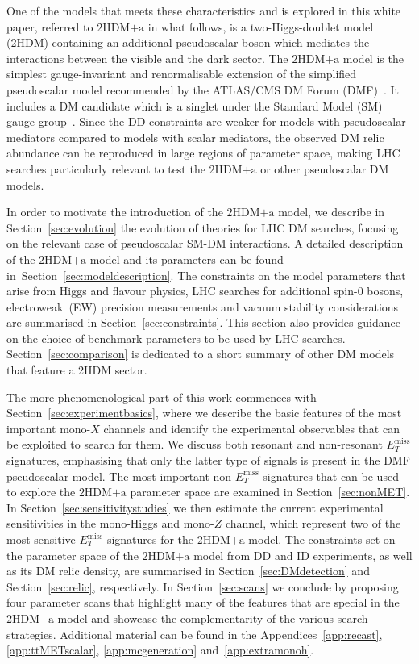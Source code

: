 \documentclass[a4paper, 11pt,notoc]{article}
\newcommand{\MET}{\ensuremath{E_T^\mathrm{miss}}\xspace}
\newcommand{\hdma}{\ensuremath{\textrm{2HDM+a}}\xspace}
\begin{document}
One of the models that meets these characteristics and is explored in this white paper,  referred to \hdma in what follows,  is a two-Higgs-doublet model (2HDM) containing an additional pseudoscalar boson which mediates the interactions between the visible and the dark sector.  The \hdma model is the simplest gauge-invariant and renormalisable extension of the  simplified pseudoscalar model recommended by the ATLAS/CMS DM Forum (DMF)~\cite{Abercrombie:2015wmb}. It includes a  DM candidate which is a singlet under the Standard Model (SM) gauge group~\cite{Ipek:2014gua,No:2015xqa,Goncalves:2016iyg,Bauer:2017ota,Tunney:2017yfp}.  Since the DD constraints are weaker for models with pseudoscalar mediators compared to models with scalar mediators, the observed DM relic abundance can be reproduced in large regions of parameter space, making LHC searches particularly relevant to test the \hdma or other pseudoscalar DM models.

In order to motivate the introduction of the \hdma model, we describe in Section~\ref{sec:evolution} the evolution of theories for LHC DM searches, focusing on the relevant case of pseudoscalar SM-DM interactions. A detailed description of the \hdma model and its parameters can be found in~Section~\ref{sec:modeldescription}. The constraints on the model parameters that arise from Higgs and flavour physics, LHC searches for additional spin-0 bosons, electroweak~(EW) precision measurements and vacuum stability considerations are summarised in Section~\ref{sec:constraints}. This section also provides guidance on the choice of benchmark parameters to be used by LHC searches. Section~\ref{sec:comparison} is dedicated to a short summary of other DM models that feature a 2HDM sector. 

The more phenomenological part of this work commences with Section~\ref{sec:experimentbasics}, where we describe the basic features of the most important mono-$X$ channels and identify the experimental observables that can be exploited to search for them. We discuss both resonant and non-resonant $\MET$ signatures, emphasising that only the latter type of signals is present in the DMF pseudoscalar model. The most important non-$\MET$ signatures that can be used to explore the \hdma parameter space  are examined in Section~\ref{sec:nonMET}. In Section~\ref{sec:sensitivitystudies} we then estimate the current experimental sensitivities  in the mono-Higgs and mono-$Z$ channel, which represent two of the most sensitive $\MET$ signatures for the \hdma model. The constraints  set on the parameter space of the \hdma model from DD and ID experiments, as well as its DM relic density, are summarised in Section~\ref{sec:DMdetection} and Section~\ref{sec:relic}, respectively. In Section~\ref{sec:scans} we conclude by proposing four parameter scans that highlight many of the features that are special in the \hdma model and showcase the complementarity of the various search strategies.  Additional material can be found in the Appendices~\ref{app:recast}, \ref{app:ttMETscalar}, \ref{app:mcgeneration} and~\ref{app:extramonoh}.
\end{document}
